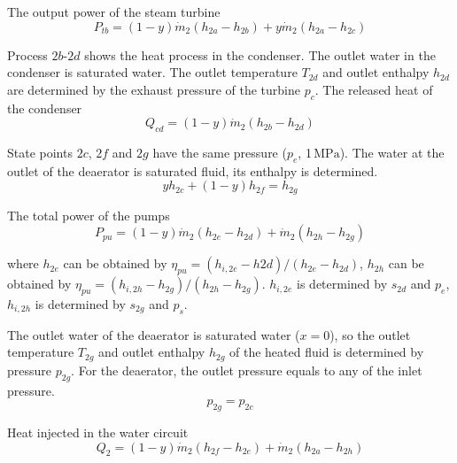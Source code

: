     The output power of the steam turbine
    \begin{equation}
  P_{tb}=\left(1-y\right)\dot{m}_{2}\left(h_{2a}-h_{2b}\right)+y\dot{m}_{2}\left(h_{2a}-h_{2c}\right)
  \end{equation}
  
  Process $2b$-$2d$ shows the heat process in the condenser. The outlet water in the condenser is saturated water. The outlet temperature $T_{2d}$ and outlet enthalpy $h_{2d}$ are determined by the exhaust pressure of the turbine $p_c$.
  The released heat of the condenser
  \begin{equation}
      Q_{cd} = (1-y)\dot{m}_2 (h_{2b} - h_{2d})
\end{equation}

  State points $2c$, $2f$ and $2g$ have the same pressure ($p_e$, 1$\,\mathrm{MPa}$). The water at the outlet of the deaerator is saturated fluid, its enthalpy is determined.
  \begin{equation}
  y h_{2c} + (1-y) h_{2f} = h_{2g}
\end{equation}
  
  The total power of the pumps 
  \begin{equation}
	P_{pu}=\left(1-y\right)\dot{m}_{2}\left(h_{2e}-h_{2d}\right)+\dot{m}_{2}\left(h_{2h}-h_{2g}\right)
\end{equation}
    
    where $h_{2e}$ can be obtained by $\eta_{pu} = (h_{i,2e}-h{2d})/(h_{2e}-h_{2d})$, $h_{2h}$ can be obtained by $\eta_{pu} = (h_{i,2h}-h_{2g})/(h_{2h}-h_{2g})$. $h_{i,2e}$ is determined by $s_{2d}$ and $p_e$, $h_{i,2h}$ is determined by $s_{2g}$ and $p_s$.
    
    The outlet water of the deaerator is saturated water ($x = 0$), so the outlet temperature $T_{2g}$ and outlet enthalpy $h_{2g}$ of the heated fluid is determined by pressure $p_{2g}$. For the deaerator, the outlet pressure equals to any of the inlet pressure.
    \begin{equation}
  p_{2g} = p_{2c}
\end{equation}

    
  Heat injected in the water circuit
\begin{equation}
	    Q_2=\left(1-y\right)\dot{m}_{2}\left(h_{2f}-h_{2e}\right)+\dot{m}_{2}\left(h_{2a}-h_{2h}\right)
    \end{equation}

